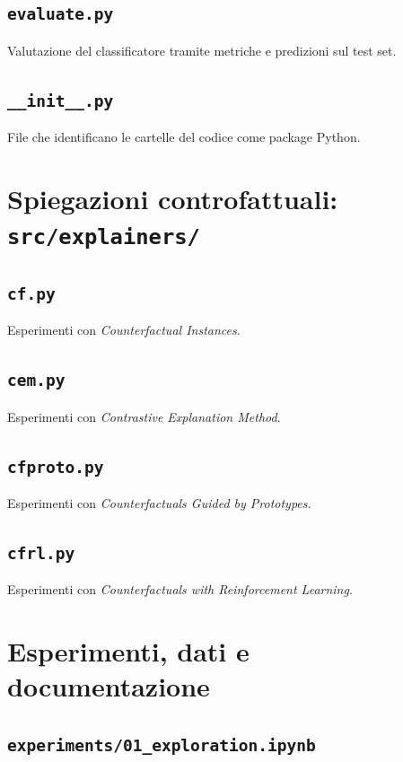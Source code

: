 \documentclass[10pt,a4paper,oneside]{book}
\begin{document}
\subsection{\texttt{evaluate.py}}

Valutazione del classificatore tramite metriche e predizioni sul test set.

\subsection{\texttt{\_\_init\_\_.py}}

File che identificano le cartelle del codice come package Python.


\section{Spiegazioni controfattuali: \texttt{src/explainers/}}

\subsection{\texttt{cf.py}}

Esperimenti con \textit{Counterfactual Instances}.

\subsection{\texttt{cem.py}}

Esperimenti con \textit{Contrastive Explanation Method}.

\subsection{\texttt{cfproto.py}}

Esperimenti con \textit{Counterfactuals Guided by Prototypes}.

\subsection{\texttt{cfrl.py}}

Esperimenti con \textit{Counterfactuals with Reinforcement Learning}.


\section{Esperimenti, dati e documentazione}

\subsection{\texttt{experiments/01\_exploration.ipynb}}
\end{document}
